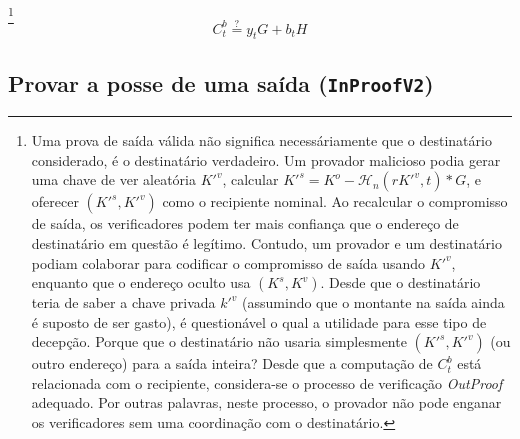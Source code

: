 \begin{enumerate}
\footnote{Uma prova de saída válida não significa necessáriamente que o destinatário considerado, é o destinatário verdadeiro. Um provador malicioso podia gerar uma chave de ver aleatória $K'^v$, calcular $K'^s = K^o - \mathcal{H}_n(rK'^v,t)*G$, e oferecer $(K'^s, K'^v)$ como o recipiente nominal. Ao recalcular o compromisso de saída, os verificadores podem ter mais confiança que o endereço de destinatário em questão é legítimo. Contudo, um provador e um destinatário podiam colaborar para codificar o compromisso de saída usando $K'^v$, enquanto que o endereço oculto usa $(K^s, K^v)$. Desde que o destinatário teria de saber a chave privada $k'^v$ (assumindo que o montante na saída ainda é suposto de ser gasto), é questionável o qual a utilidade para esse tipo de decepção. Porque que o destinatário não usaria simplesmente $(K'^s, K'^v)$ (ou outro endereço) para a saída inteira? Desde que a computação de $C^b_t$ está relacionada com o recipiente, considera-se o processo de verificação {\em OutProof} adequado. Por outras palavras, neste processo, o provador não pode enganar os verificadores sem uma coordinação com o destinatário.}\vspace{.175cm}
    \[C^b_t \stackrel{?}{=} y_t G + b_t H\]
\end{enumerate}{}


\subsection{Provar a posse de uma saída ({\tt InProofV2})}
\label{subsec:proofs-output-ownership-inproof}

